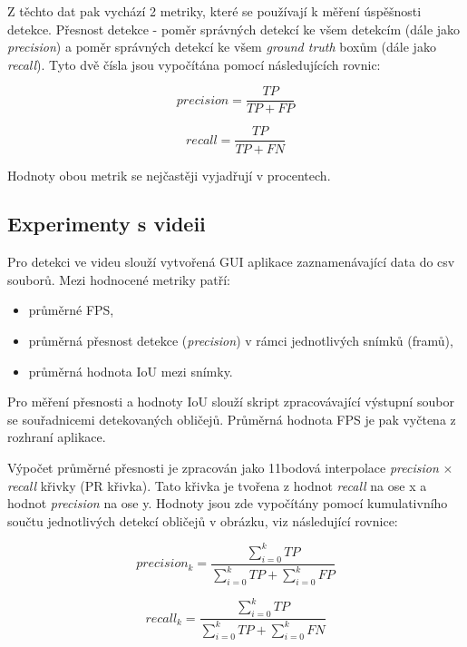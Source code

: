 Z těchto dat pak vychází 2 metriky, které se používají k měření úspěšnosti detekce. Přesnost detekce - poměr správných detekcí ke všem detekcím (dále jako \emph{precision}) a poměr správných detekcí ke všem \emph{ground truth} boxům (dále jako \emph{recall}). Tyto dvě čísla jsou vypočítána pomocí následujících rovnic:

\begin{equation}
  precision = \frac{TP}{TP + FP}
\end{equation}

\begin{equation}
  recall = \frac{TP}{TP + FN}
\end{equation}

\noindent Hodnoty obou metrik se nejčastěji vyjadřují v procentech.


\subsection*{Experimenty s videii}
Pro detekci ve videu slouží vytvořená GUI aplikace zaznamenávající data do csv souborů. Mezi hodnocené metriky patří:

\begin{itemize}
  \item průměrné FPS,
  \item průměrná přesnost detekce (\emph{precision}) v rámci jednotlivých snímků (framů),
  \item průměrná hodnota IoU mezi snímky.
\end{itemize}

Pro měření přesnosti a hodnoty IoU slouží skript zpracovávající výstupní soubor se souřadnicemi detekovaných obličejů. Průměrná hodnota FPS je pak vyčtena z rozhraní aplikace.

Výpočet průměrné přesnosti je zpracován jako 11bodová interpolace \cite{interpolace} \emph{precision} $\times$ \emph{recall} křivky (PR křivka). Tato křivka je tvořena z hodnot \emph{recall} na ose x a hodnot \emph{precision} na ose y. Hodnoty jsou zde vypočítány pomocí kumulativního součtu jednotlivých detekcí obličejů v obrázku, viz následující rovnice:

\begin{equation}
  precision_k = \frac{\sum_{i=0}^{k} TP}{\sum_{i=0}^{k} TP + \sum_{i=0}^{k} FP}
\end{equation}

\begin{equation}
  recall_k = \frac{\sum_{i=0}^{k} TP}{\sum_{i=0}^{k} TP + \sum_{i=0}^{k} FN}
\end{equation}

